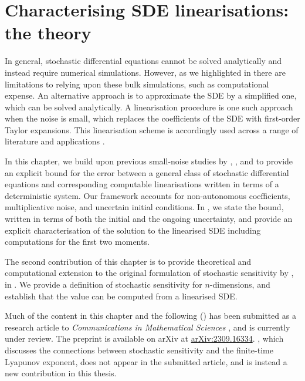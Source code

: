\chapter{Characterising SDE linearisations: the theory}\label{ch:linear_theory}
In general, stochastic differential equations cannot be solved analytically and instead require numerical simulations.
However, as we highlighted in  there are limitations to relying upon these bulk simulations, such as computational expense.
An alternative approach is to approximate the SDE by a simplified one, which can be solved analytically.
A linearisation procedure is one such approach when the noise is small, which replaces the coefficients of the SDE with first-order Taylor expansions.
This linearisation scheme is accordingly used across a range of literature and applications \citep{Jazwinski_2014_StochasticProcessesFiltering,SarkkaSolin_2019_AppliedStochasticDifferential,KaszasHaller_2020_UniversalUpperEstimate,ArchambeauEtAl_2007_GaussianProcessApproximations,Sanz-AlonsoStuart_2017_GaussianApproximationsSmall,LawEtAl_2015_DataAssimilationMathematical,ReichCotter_2015_ProbabilisticForecastingBayesian,BudhirajaEtAl_2019_AssimilatingDataModels,LeGlandWang_2002_AsymptoticNormalityPartially}.

In this chapter, we build upon previous small-noise studies by \citet{Blagoveshchenskii_1962_DiffusionProcessesDepending}, \citet{FreidlinWentzell_1998_RandomPerturbationsDynamical}, and \citet{Sanz-AlonsoStuart_2017_GaussianApproximationsSmall} to provide an explicit bound for the error between a general class of stochastic differential equations and corresponding computable linearisations written in terms of a deterministic system.
Our framework accounts for non-autonomous coefficients, multiplicative noise, and uncertain initial conditions.
In , we state the bound, written in terms of both the initial and the ongoing uncertainty, and provide an explicit characterisation of the solution to the linearised SDE including computations for the first two moments.

The second contribution of this chapter is to provide theoretical and computational extension to the original formulation of stochastic sensitivity by \citet{Balasuriya_2020_StochasticSensitivityComputable}, in .
We provide a definition of stochastic sensitivity for \(n\)-dimensions, and establish that the value can be computed from a linearised SDE.


Much of the content in this chapter and the following () has been submitted as a research article to \textit{Communications in Mathematical Sciences} \citep{BlakeEtAl_2023_ConvergenceStochasticDifferential}, and is currently under review.
The preprint is available on arXiv at \href{https://arxiv.org/abs/2309.16334}{arXiv:2309.16334}.
, which discusses the connections between stochastic sensitivity and the finite-time Lyapunov exponent, does not appear in the submitted article, and is instead a new contribution in this thesis.


